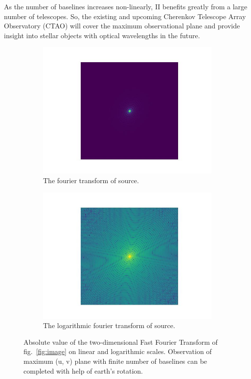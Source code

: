 As the number of baselines increases non-linearly, II benefits greatly from a large number of telescopes. So, the existing and upcoming Cherenkov Telescope Array Observatory (CTAO) will cover the maximum observational plane and provide insight into stellar objects with optical wavelengths in the future.
\begin{figure}
	\centering
	\begin{subfigure}{\linewidth}
		\includegraphics[width=\linewidth]{fig/ft/ft.jpg}
		\caption{The fourier transform of source.}
	\end{subfigure}\hfill
	\begin{subfigure}{\linewidth}
		\includegraphics[width=\linewidth]{fig/ft/ft_log.jpg}
		\caption{The logarithmic fourier transform of source.}
	\end{subfigure}
	\caption{Absolute value of the two-dimensional Fast Fourier Transform of fig.~\ref{fig:image} on linear and logarithmic scales. Observation of maximum (u, v) plane with finite number of baselines can be completed with help of earth's rotation.}
	\label{fig:ft}
\end{figure}
